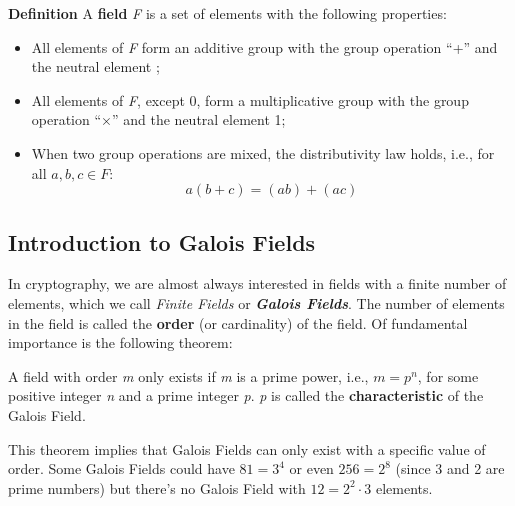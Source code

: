 \documentclass[11pt, a4paper]{article}
\newcommand{\doublequotes}[1]{“#1”}
\begin{document}
\begin{framed}
\hfill\break\textbf{Definition} A \textbf{field} \textit{F} is a set of elements with the following properties:
\begin{itemize}
    \item All elements of \textit{F} form an additive group with the group operation \doublequotes{+} and the neutral element ;
    \item All elements of \textit{F}, except 0, form a multiplicative group with the group operation \doublequotes{$\times$} and the neutral element 1;
    \item When two group operations are mixed, the distributivity law holds, i.e., for all $a,b,c\in F$:$$a(b+c)=(ab)+(ac)$$
\end{itemize}
\end{framed}

\newpage
\subsection{Introduction to Galois Fields}
In cryptography, we are almost always interested in fields with a finite number of elements, which we call \textit{Finite Fields} or \textbf{\textit{Galois Fields}}. The number of elements in the field is called the \textbf{order} (or cardinality) of the field. Of fundamental importance is the following theorem:
\begin{framed}
    A field with order \textit{m} only exists if \textit{m} is a prime power, i.e., $m=p^n$, for some positive integer \textit{n} and a prime integer \textit{p}. \textit{p} is called the \textbf{characteristic} of the Galois Field.
\end{framed}
\hfill\break
This theorem implies that Galois Fields can only exist with a specific value of order. Some Galois Fields could have $81=3^4$ or even $256=2^8$ (since 3 and 2 are prime numbers) but there's no Galois Field with $12=2^2\cdot3$ elements.
\end{document}

